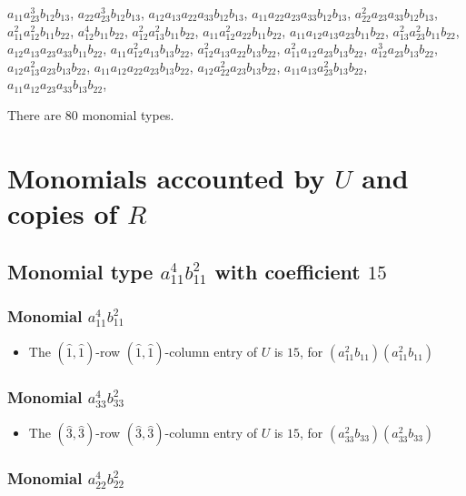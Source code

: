 \documentclass{article}
\begin{document}
$ a_{11} a_{23}^{3} b_{12} b_{13} $,
$ a_{22} a_{23}^{3} b_{12} b_{13} $,
$ a_{12} a_{13} a_{22} a_{33} b_{12} b_{13} $,
$ a_{11} a_{22} a_{23} a_{33} b_{12} b_{13} $,
$ a_{22}^{2} a_{23} a_{33} b_{12} b_{13} $,
$ a_{11}^{2} a_{12}^{2} b_{11} b_{22} $,
$ a_{12}^{4} b_{11} b_{22} $,
$ a_{12}^{2} a_{13}^{2} b_{11} b_{22} $,
$ a_{11} a_{12}^{2} a_{22} b_{11} b_{22} $,
$ a_{11} a_{12} a_{13} a_{23} b_{11} b_{22} $,
$ a_{13}^{2} a_{23}^{2} b_{11} b_{22} $,
$ a_{12} a_{13} a_{23} a_{33} b_{11} b_{22} $,
$ a_{11} a_{12}^{2} a_{13} b_{13} b_{22} $,
$ a_{12}^{2} a_{13} a_{22} b_{13} b_{22} $,
$ a_{11}^{2} a_{12} a_{23} b_{13} b_{22} $,
$ a_{12}^{3} a_{23} b_{13} b_{22} $,
$ a_{12} a_{13}^{2} a_{23} b_{13} b_{22} $,
$ a_{11} a_{12} a_{22} a_{23} b_{13} b_{22} $,
$ a_{12} a_{22}^{2} a_{23} b_{13} b_{22} $,
$ a_{11} a_{13} a_{23}^{2} b_{13} b_{22} $,
$ a_{11} a_{12} a_{23} a_{33} b_{13} b_{22} $,


There are 80 monomial types.

\section{Monomials accounted by $U$ and copies of $R$}
\subsection{Monomial type $ a_{11}^{4} b_{11}^{2} $ with coefficient $ 15 $}

\subsubsection{Monomial $ a_{11}^{4} b_{11}^{2} $}

\begin{itemize}
\item The $(\hat{1}, \hat{1})$-row $(\hat{1}, \hat{1})$-column entry of $U$ is $15$, for $( a_{11}^{2} b_{11} )( a_{11}^{2} b_{11} )$ 
\end{itemize}
\subsubsection{Monomial $ a_{33}^{4} b_{33}^{2} $}

\begin{itemize}
\item The $(\hat{3}, \hat{3})$-row $(\hat{3}, \hat{3})$-column entry of $U$ is $15$, for $( a_{33}^{2} b_{33} )( a_{33}^{2} b_{33} )$ 
\end{itemize}
\subsubsection{Monomial $ a_{22}^{4} b_{22}^{2} $}
\end{document}
